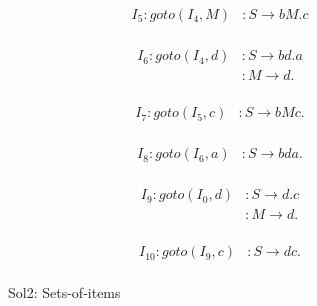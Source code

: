 \documentclass{article}
\begin{document}
\begin{figure}[h!]
\begin{multicols}{2}
\begin{equation*}
\begin{aligned}
I_5 : goto(I_4,M) &: S \rightarrow bM.c  \\
\end{aligned}
\end{equation*}


\begin{equation*}
\begin{aligned}
I_6 : goto(I_4,d) &: S \rightarrow bd.a  \\
&: M \rightarrow d.  \\
\end{aligned}
\end{equation*}

\begin{equation*}
\begin{aligned}
I_7 : goto(I_5,c) &: S \rightarrow bMc.  \\
\end{aligned}
\end{equation*}

\begin{equation*}
\begin{aligned}
I_8 : goto(I_6,a) &: S \rightarrow bda.  \\
\end{aligned}
\end{equation*}

\begin{equation*}
\begin{aligned}
I_9 : goto(I_0,d) &: S \rightarrow d.c  \\
&: M \rightarrow d.  \\
\end{aligned}
\end{equation*}


\begin{equation*}
\begin{aligned}
I_{10} : goto(I_9,c) &: S \rightarrow dc.  \\
\end{aligned}
\end{equation*}
\end{multicols}
\caption{Sol2: Sets-of-items}
\label{soi}
\end{figure}
\end{document}
